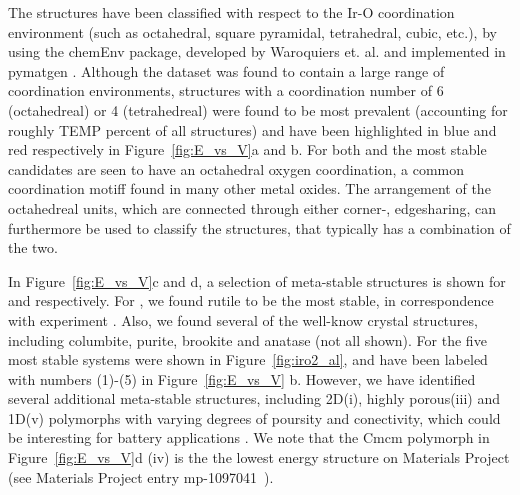 %
The structures have been classified with respect to the Ir-O coordination environment
(such as octahedral, square pyramidal, tetrahedral, cubic, etc.),
by using the chemEnv package, developed by Waroquiers et. al. \cite{Waroquiers2017} and implemented in pymatgen \cite{Ong2013}.
%
Although the dataset was found to contain a large range of coordination environments,
structures with a coordination number of 6 (octahedreal) or 4 (tetrahedreal) were found to be most prevalent
(accounting for roughly TEMP percent of all structures)
and have been highlighted in blue and red respectively in Figure~\ref{fig:E_vs_V}a and b.
%
For both \IrOtwo and \IrOthree the most stable candidates are seen to have an octahedral oxygen coordination,
a common coordination motiff found in many other metal oxides.\cite{Waroquiers2017}
%
The arrangement of the octahedreal units, which are connected through either corner-, edgesharing,
can furthermore be used to classify the structures, that typically has a combination of the two.


%
In Figure~\ref{fig:E_vs_V}c and d, a selection of meta-stable structures is shown for \IrOtwo and \IrOthree respectively.
%
For \IrOtwo, we found rutile to be the most stable,
in correspondence with experiment \cite{}.
%
Also, we found several of the well-know \IrOtwo crystal structures, including columbite, purite, brookite and anatase (not all shown).
%
For \IrOthree the five most stable systems were shown in Figure~\ref{fig:iro2_al},
and have been labeled with numbers (1)-(5) in Figure~\ref{fig:E_vs_V} b.
%
However, we have identified several additional meta-stable structures, including 2D(i), highly porous(iii) and 1D(v) polymorphs with varying degrees of poursity and conectivity,
which could be interesting for battery applications \cite{}.
%
We note that the \IrOthree Cmcm polymorph in Figure~\ref{fig:E_vs_V}d (iv) is the the lowest energy \IrOthree structure on Materials Project
(see Materials Project entry mp-1097041~\cite{mp-1097041}).



